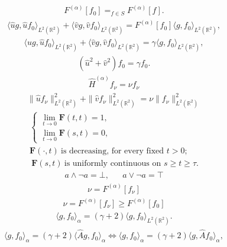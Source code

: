 \begin{align*} F^{(\alpha)} [f_0] = _{f \in S} F^{(\alpha)} \left[f \right].\end{align*}
\begin{align*}\langle \widehat{u}g, \widehat{u}f_0 \rangle_{L^2 (\mathbb{R}^2)} + \langle \widehat{v}g, \widehat{v}f_0 \rangle_{L^2 (\mathbb{R}^2)} = F^{(\alpha)}[f_0] \langle g,f_0 \rangle_{L^2 (\mathbb{R}^2)},\end{align*}
\begin{align*}\langle \widehat{u}g, \widehat{u}f_0 \rangle_{L^2 (\mathbb{R}^2)} + \langle \widehat{v}g, \widehat{v}f_0 \rangle_{L^2 (\mathbb{R}^2)} = \gamma \langle g,f_0 \rangle_{L^2 (\mathbb{R}^2)},\end{align*}
\begin{align*}\left(\widehat{u}^2 + \widehat{v}^2 \right) f_0= \gamma f_0.\end{align*}
\begin{align*}\widehat{H}^{(\alpha)} f_{\nu} = \nu f_{\nu}\end{align*}
\begin{align*}\|\widehat{u} f_{\nu} \|_{L^2 (\mathbb{R}^2)}^2 + \|\widehat{v} f_{\nu} \|_{L^2 (\mathbb{R}^2)}^2 = \nu \| f_{\nu} \|_{L^2 (\mathbb{R}^2)}^2\end{align*}
\begin{align*} \begin{cases} \lim_{t\to 0}\mathbf{F}(t,t)=1, &\\ \lim_{t\to 0}\mathbf{F}(s,t)=0, & \end{cases} \\ \mathbf{F}(\cdot,t)\ \text{is decreasing, for every fixed $t>0$;}\\ \ \mathbf{F}(s,t)\ \text{is uniformly continuous on $s\geq t\geq \tau$.}\end{align*}
\begin{align*}a \wedge \neg a = \bot, &&a \vee \neg a = \top\end{align*}
\begin{align*}\nu = F^{(\alpha)} \left[ f_{\nu} \right]\end{align*}
\begin{align*}\nu = F^{(\alpha)} \left[ f_{\nu} \right] \geq F^{(\alpha)} \left[f_0 \right]\end{align*}
\begin{align*}\langle g,f_0 \rangle_{\alpha} = (\gamma+2) \langle g, f_0 \rangle_{L^2 (\mathbb{R}^2)}.\end{align*}
\begin{align*}\langle g,f_0 \rangle_{\alpha} = (\gamma +2) \langle \widehat{A} g, f_0 \rangle_{ \alpha} \Leftrightarrow \langle g,f_0 \rangle_{\alpha} = (\gamma+2) \langle g, \widehat{A} f_0 \rangle_{ \alpha},\end{align*}
